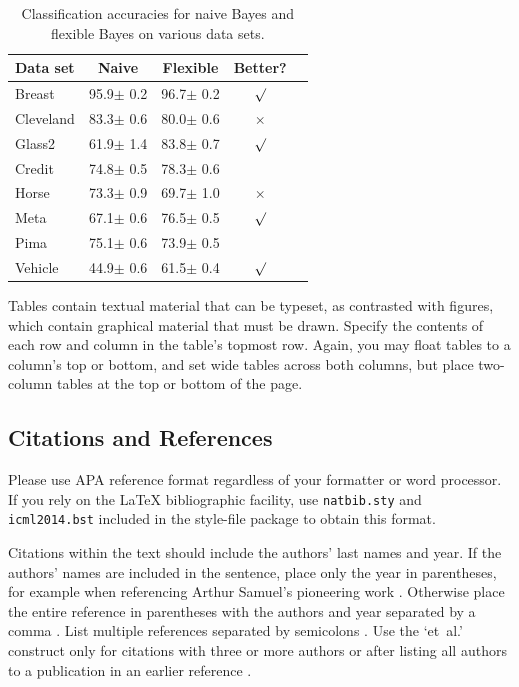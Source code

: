\documentclass{article}
\begin{document}
\begin{table}[t]
\caption{Classification accuracies for naive Bayes and flexible 
Bayes on various data sets.}
\label{sample-table}
\vskip 0.15in
\begin{center}
\begin{small}
\begin{sc}
\begin{tabular}{lcccr}
\hline
\abovespace\belowspace
Data set & Naive & Flexible & Better? \\
\hline
\abovespace
Breast    & 95.9$\pm$ 0.2& 96.7$\pm$ 0.2& $\surd$ \\
Cleveland & 83.3$\pm$ 0.6& 80.0$\pm$ 0.6& $\times$\\
Glass2    & 61.9$\pm$ 1.4& 83.8$\pm$ 0.7& $\surd$ \\
Credit    & 74.8$\pm$ 0.5& 78.3$\pm$ 0.6&         \\
Horse     & 73.3$\pm$ 0.9& 69.7$\pm$ 1.0& $\times$\\
Meta      & 67.1$\pm$ 0.6& 76.5$\pm$ 0.5& $\surd$ \\
Pima      & 75.1$\pm$ 0.6& 73.9$\pm$ 0.5&         \\
\belowspace
Vehicle   & 44.9$\pm$ 0.6& 61.5$\pm$ 0.4& $\surd$ \\
\hline
\end{tabular}
\end{sc}
\end{small}
\end{center}
\vskip -0.1in
\end{table}

Tables contain textual material that can be typeset, as contrasted 
with figures, which contain graphical material that must be drawn. 
Specify the contents of each row and column in the table's topmost
row. Again, you may float tables to a column's top or bottom, and set
wide tables across both columns, but place two-column tables at the
top or bottom of the page.
 
\subsection{Citations and References} 

Please use APA reference format regardless of your formatter
or word processor. If you rely on the \LaTeX\/ bibliographic 
facility, use {\tt natbib.sty} and {\tt icml2014.bst} 
included in the style-file package to obtain this format.

Citations within the text should include the authors' last names and
year. If the authors' names are included in the sentence, place only
the year in parentheses, for example when referencing Arthur Samuel's
pioneering work . Otherwise place the entire
reference in parentheses with the authors and year separated by a
comma \cite{Samuel59}. List multiple references separated by
semicolons \cite{kearns89,Samuel59,mitchell80}. Use the `et~al.'
construct only for citations with three or more authors or after
listing all authors to a publication in an earlier reference \cite{MachineLearningI}.
\end{document}
